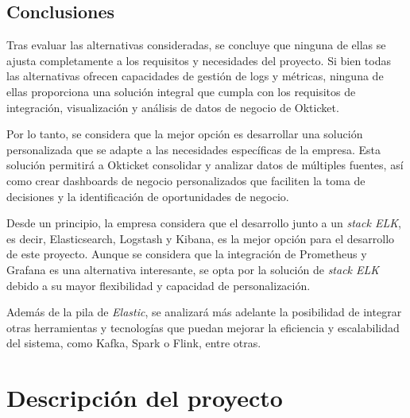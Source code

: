 \subsection{Conclusiones}
Tras evaluar las alternativas consideradas, se concluye que ninguna de ellas se
ajusta completamente a los requisitos y necesidades del proyecto. Si bien todas
las alternativas ofrecen capacidades de gestión de logs y métricas, ninguna de
ellas proporciona una solución integral que cumpla con los requisitos de
integración, visualización y análisis de datos de negocio de Okticket.

Por lo tanto, se considera que la mejor opción es desarrollar una solución
personalizada que se adapte a las necesidades específicas de la empresa. Esta
solución permitirá a Okticket consolidar y analizar datos de múltiples fuentes,
así como crear dashboards de negocio personalizados que faciliten la toma de
decisiones y la identificación de oportunidades de negocio.

Desde un principio, la empresa considera que el desarrollo junto a un
\textit{stack ELK}, es decir, Elasticsearch, Logstash y Kibana, es la mejor
opción para el desarrollo de este proyecto. Aunque se considera que la
integración de Prometheus y Grafana es una alternativa interesante, se opta por
la solución de \textit{stack ELK} debido a su mayor flexibilidad y capacidad de
personalización.

Además de la pila de \textit{Elastic}, se analizará más adelante la posibilidad
de integrar otras herramientas y tecnologías que puedan mejorar la eficiencia y
escalabilidad del sistema, como Kafka, Spark o Flink, entre otras.


\newpage{}
\section{Descripción del proyecto}\label{sec:descripcion}
